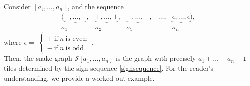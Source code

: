 Consider $[a_1,\dots,a_n]$, and the sequence 
\begin{equation}\label{signsequence}
\begin{array}{cccccccc}
  ( \underbrace{ -,\ldots,-},&  \underbrace{ + ,\dots, +},&  \underbrace{ -,\ldots,-},& \ldots,&  \underbrace{\epsilon,\ldots,\epsilon}) ,  \\
 a_1 & a_2 & a_3&\ldots&a_n
\end{array} 
\end{equation}
where $\epsilon = $
$
\begin{cases}
+  \ \text{if} \ n \ \text{is even}; \\
- \ \text{if} \ n \ \text{is odd}
\end{cases}.
$
\\

Then, the snake graph $\mathcal{S}[a_1,\dots,a_n]$ is the graph with precisely $a_1 + \dots + a_n - 1$ tiles determined by the sign sequence \ref{signsequence}. For the reader's understanding, we provide a worked out example. 

